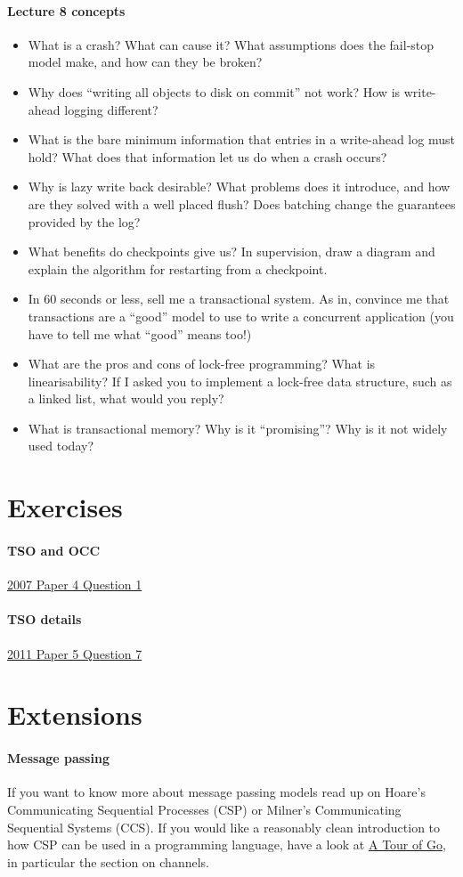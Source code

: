 \documentclass[12pt,a4paper,oneside,openright]{report}
\newcommand{\question}[2]{\paragraph{#1} #2}
\begin{document}
\question{Lecture 8 concepts}{
  \begin{itemize}
  \item What is a crash? What can cause it? What assumptions does the
    fail-stop model make, and how can they be broken?
  \item Why does ``writing all objects to disk on commit'' not work?
    How is write-ahead logging different?
  \item What is the bare minimum information that entries in a
    write-ahead log must hold? What does that information let us do
    when a crash occurs?
  \item Why is lazy write back desirable? What problems does it
    introduce, and how are they solved with a well placed flush? Does
    batching change the guarantees provided by the log?
  \item What benefits do checkpoints give us? In supervision, draw a
    diagram and explain the algorithm for restarting from a
    checkpoint.
  \item In 60 seconds or less, sell me a transactional system. As in,
    convince me that transactions are a ``good'' model to use to write
    a concurrent application (you have to tell me what ``good'' means
    too!)
  \item What are the pros and cons of lock-free programming? What is
    linearisability? If I asked you to implement a lock-free data
    structure, such as a linked list, what would you reply?
  \item What is transactional memory? Why is it ``promising''? Why is
    it not widely used today?
  \end{itemize}
}


\section{Exercises}

\question{TSO and
  OCC}{\href{https://www.cl.cam.ac.uk/teaching/exams/pastpapers/y2007p4q1.pdf}{2007
    Paper 4 Question 1}}

\question{TSO
  details}{\href{https://www.cl.cam.ac.uk/teaching/exams/pastpapers/y2011p5q7.pdf}{2011
    Paper 5 Question 7}}

\section{Extensions}

\question{Message passing}{If you want to know more about message
  passing models read up on Hoare's Communicating Sequential Processes
  (CSP) or Milner's Communicating Sequential Systems (CCS). If you
  would like a reasonably clean introduction to how CSP can be used in
  a programming language, have a look at
  \href{https://tour.golang.org}{A Tour of Go}, in particular the
  section on channels.}
\end{document}
